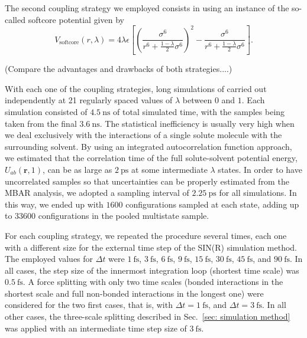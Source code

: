 \documentclass[
aip,
jcp,
reprint,
]{revtex4-1}
\newcommand{\vt}[1]{\boldsymbol{\mathbf{#1}}}          %
\begin{document}
The second coupling strategy we employed consists in using an instance of the so-called softcore potential \cite{Beutler_1994} given by
\begin{equation*}
V_\mathrm{softcore}(r,\lambda) = 4 \lambda \epsilon \left[\left(\frac{\sigma^6}{r^6 + \frac{1-\lambda}{2}\sigma^6}\right)^2 - \frac{\sigma^6}{r^6 + \frac{1-\lambda}{2}\sigma^6}\right].
\end{equation*}

(Compare the advantages and drawbacks of both strategies....)

With each one of the coupling strategies, long simulations of carried out independently at 21 regularly spaced values of $\lambda$ between $0$ and $1$.
Each simulation consisted of $4.5~\mathrm{ns}$ of total simulated time, with the samples being taken from the final $3.6~\mathrm{ns}$.
The statistical inefficiency is usually very high when we deal exclusively with the interactions of a single solute molecule with the surrounding solvent.
By using an integrated autocorrelation function approach, \cite{Chodera_2007} we estimated that the correlation time of the full solute-solvent potential energy, $U_{ab}(\vt r, 1)$, can be as large as $2~\mathrm{ps}$ at some intermediate $\lambda$ states.
In order to have uncorrelated samples so that uncertainties can be properly estimated from the MBAR analysis, we adopted a sampling interval of $2.25~\mathrm{ps}$ for all simulations.
In this way, we ended up with $1600$ configurations sampled at each state, adding up to $33600$ configurations in the pooled multistate sample.

For each coupling strategy, we repeated the procedure several times, each one with a different size for the external time step of the SIN(R) simulation method.
The employed values for $\Delta t$ were $1~\mathrm{fs}$, $3~\mathrm{fs}$, $6~\mathrm{fs}$, $9~\mathrm{fs}$, $15~\mathrm{fs}$, $30~\mathrm{fs}$, $45~\mathrm{fs}$, and $90~\mathrm{fs}$.
In all cases, the step size of the innermost integration loop (shortest time scale) was $0.5~\mathrm{fs}$.
A force splitting with only two time scales (bonded interactions in the shortest scale and full non-bonded interactions in the longest one) were considered for the two first cases, that is, with $\Delta t = 1~\mathrm{fs}$, and $\Delta t = 3~\mathrm{fs}$.
In all other cases, the three-scale splitting described in Sec.~\ref{sec: simulation method} was applied with an intermediate time step size of $3~\mathrm{fs}$.
\end{document}
